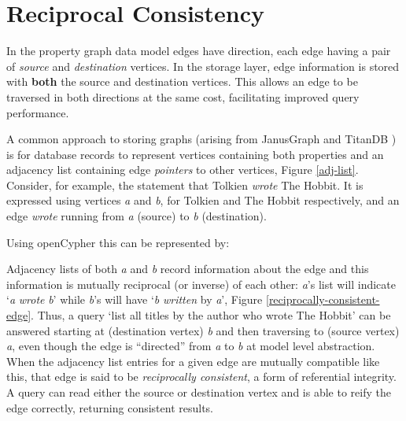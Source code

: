 \section{Reciprocal Consistency}
\label{sec:recipr-cons}

In the property graph data model edges have direction, each edge having a pair of \emph{source} and \emph{destination} vertices. In the storage layer, edge information is stored with \textbf{both} the source and destination vertices. This allows an edge to be traversed in both directions at the same cost, facilitating improved query performance.

A common approach to storing graphs (arising from JanusGraph \cite{janusgraph} and TitanDB \cite{TitanDB}) is for database records to represent vertices containing both properties and an adjacency list containing edge \emph{pointers} to other vertices, Figure \ref{adj-list}. Consider, for example, the statement that Tolkien \textit{wrote} The Hobbit. It is expressed using vertices \emph{a} and \emph{b}, for Tolkien and The Hobbit respectively, and an edge \textit{wrote} running from \emph{a} (source) to \emph{b} (destination).

Using openCypher \cite{openCypher} this can be represented by:


Adjacency lists of both \emph{a} and \emph{b} record information about the edge and this information is mutually reciprocal (or inverse) of each other: \emph{a}'s list will indicate `\emph{a} \emph{wrote} \emph{b}' while \emph{b}'s will have `\emph{b} \emph{written} by \emph{a}', Figure \ref{reciprocally-consistent-edge}. Thus, a query `list all titles by the author who wrote The Hobbit' can be answered starting at (destination vertex) \emph{b} and then traversing to (source vertex) \emph{a}, even though the edge is ``directed'' from \emph{a} to \emph{b} at model level abstraction. When the adjacency list entries for a given edge are mutually compatible like this, that edge is said to be \emph{reciprocally consistent}, a form of referential integrity. A query can read either the source or destination vertex and is able to reify the edge correctly, returning consistent results.

